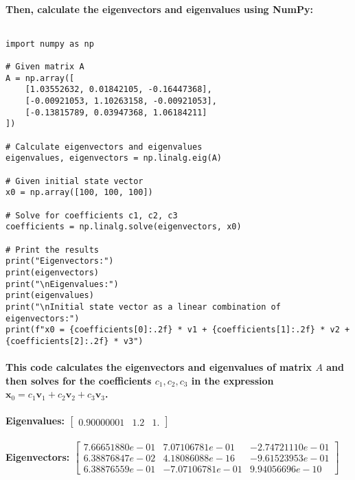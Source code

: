 \paragraph{Then, calculate the eigenvectors and eigenvalues using NumPy:}
% 
$$$$
% 
\begin{lstlisting}[style=pystyle]
import numpy as np

# Given matrix A
A = np.array([
    [1.03552632, 0.01842105, -0.16447368],
    [-0.00921053, 1.10263158, -0.00921053],
    [-0.13815789, 0.03947368, 1.06184211]
])

# Calculate eigenvectors and eigenvalues
eigenvalues, eigenvectors = np.linalg.eig(A)

# Given initial state vector
x0 = np.array([100, 100, 100])

# Solve for coefficients c1, c2, c3
coefficients = np.linalg.solve(eigenvectors, x0)

# Print the results
print("Eigenvectors:")
print(eigenvectors)
print("\nEigenvalues:")
print(eigenvalues)
print("\nInitial state vector as a linear combination of eigenvectors:")
print(f"x0 = {coefficients[0]:.2f} * v1 + {coefficients[1]:.2f} * v2 + {coefficients[2]:.2f} * v3")
\end{lstlisting}
% 
\paragraph{This code calculates the eigenvectors and eigenvalues of matrix \(A\) and then solves for the coefficients \(c_1, c_2, c_3\) in the expression \(\mathbf{x}_0 = c_1 \mathbf{v}_1 + c_2 \mathbf{v}_2 + c_3 \mathbf{v}_3\).}
% 
\paragraph{\textbf{Eigenvalues:}
    $
        \left[ \begin{matrix}
                0.90000001 & 1.2 & 1.
            \end{matrix}\right]
    $}
\paragraph{\textbf{Eigenvectors:}
    $
        \left[
            \begin{matrix}
                7.66651880e-01 & 7.07106781e-01  & -2.74721110e-01 \\
                6.38876847e-02 & 4.18086088e-16  & -9.61523953e-01 \\
                6.38876559e-01 & -7.07106781e-01 & 9.94056696e-10
            \end{matrix}
            \right]
    $}
